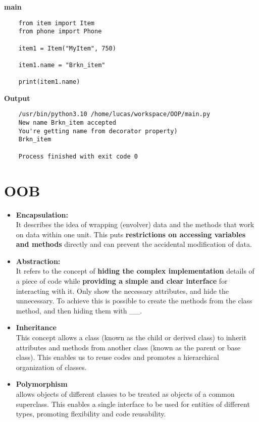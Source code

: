 \documentclass{article}
\begin{document}
\textbf{main}
\begin{lstlisting}
	from item import Item
	from phone import Phone
	
	item1 = Item("MyItem", 750)
	
	item1.name = "Brkn_item"
	
	print(item1.name)
\end{lstlisting}

\textbf{Output}

\begin{lstlisting}
	/usr/bin/python3.10 /home/lucas/workspace/OOP/main.py 
	New name Brkn_item accepted
	You're getting name from decorator property)
	Brkn_item
	
	Process finished with exit code 0
\end{lstlisting}

\section{OOB}
\begin{itemize}
	\item \textbf{Encapsulation:}\\
	It describes the idea of wrapping (envolver) data and the methods that work on data within one unit. This puts \textbf{restrictions on accessing variables and methods} directly and can prevent the accidental modification of data.
	
	\item \textbf{Abstraction:}\\
	It refers to the concept of \textbf{hiding the complex implementation} details of a piece of code while \textbf{providing a simple and clear interface} for interacting with it. 
	Only show the necessary attributes, and hide the unnecessary.
	To achieve this is possible to create the methods from the class method, and then hiding them with \_\_.\\
	
	\item \textbf{Inheritance}\\
	This concept allows a class (known as the child or derived class) to inherit attributes and methods from another class (known as the parent or base class). This enables us to reuse codes and promotes a hierarchical organization of classes.\\
	\item \textbf{Polymorphism}\\
	allows objects of different classes to be treated as objects of a common superclass. This enables a single interface to be used for entities of different types, promoting flexibility and code reusability.\\
\end{itemize}
\end{document}
